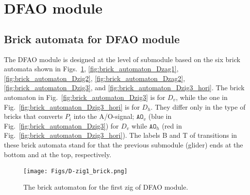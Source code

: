 \documentclass[dvipdfmx,review]{elsarticle}
\begin{document}
\clearpage


\clearpage

	\section{DFAO module}
	\label{sect:appendix_DFAO_module}

	\subsection{Brick automata for DFAO module}
	\label{ap_subsect:DFAO_module_BA}

The DFAO module is designed at the level of submodule based on the six brick automata shown in Figs.~\ref{fig:brick_automaton_Dzig1}, \ref{fig:brick_automaton_Dzag1}, \ref{fig:brick_automaton_Dzig2}, \ref{fig:brick_automaton_Dzag2}, \ref{fig:brick_automaton_Dzig3}, and \ref{fig:brick_automaton_Dzig3_hori}. 
The brick automaton in Fig.~\ref{fig:brick_automaton_Dzig3} is for $D_v$, while the one in Fig.~\ref{fig:brick_automaton_Dzig3_hori} is for $D_h$. 
They differ only in the type of bricks that converts $P_i$ into the A/O-signal; $\mathtt{AO}_v$ (blue in Fig.~\ref{fig:brick_automaton_Dzig3}) for $D_v$ while $\mathtt{AO}_h$ (red in Fig.~\ref{fig:brick_automaton_Dzig3_hori}). 
The labels B and T of transitions in these brick automata stand for that the previous submodule (glider) ends at the bottom and at the top, respectively. 

\begin{figure}[ht]
\centering
\texttt{[image: Figs/D-zig1\_brick.png]}
\caption{The brick automaton for the first zig of DFAO module.}
\label{fig:brick_automaton_Dzig1}
\end{figure}
\end{document}
